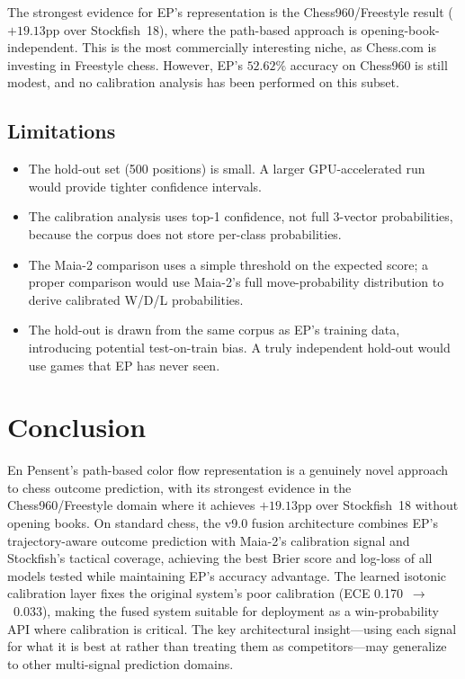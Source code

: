 \documentclass[11pt,a4paper]{article}
\begin{document}
The strongest evidence for EP's representation is the Chess960/Freestyle
result ($+19.13$pp over Stockfish~18), where the path-based approach is
opening-book-independent. This is the most commercially interesting niche,
as Chess.com is investing in Freestyle chess. However, EP's $52.62\%$
accuracy on Chess960 is still modest, and no calibration analysis has been
performed on this subset.

\subsection{Limitations}

\begin{itemize}[nosep]
  \item The hold-out set (500 positions) is small. A larger GPU-accelerated
        run would provide tighter confidence intervals.
  \item The calibration analysis uses top-1 confidence, not full 3-vector
        probabilities, because the corpus does not store per-class
        probabilities.
  \item The Maia-2 comparison uses a simple threshold on the expected
        score; a proper comparison would use Maia-2's full move-probability
        distribution to derive calibrated W/D/L probabilities.
  \item The hold-out is drawn from the same corpus as EP's training data,
        introducing potential test-on-train bias. A truly independent
        hold-out would use games that EP has never seen.
\end{itemize}

\section{Conclusion}
\label{sec:conclusion}

En Pensent's path-based color flow representation is a genuinely novel
approach to chess outcome prediction, with its strongest evidence in the
Chess960/Freestyle domain where it achieves $+19.13$pp over Stockfish~18
without opening books. On standard chess, the v9.0 fusion architecture
combines EP's trajectory-aware outcome prediction with Maia-2's calibration
signal and Stockfish's tactical coverage, achieving the best Brier score
and log-loss of all models tested while maintaining EP's accuracy
advantage. The learned isotonic calibration layer fixes the original
system's poor calibration (ECE 0.170~$\to$~0.033), making the fused system
suitable for deployment as a win-probability API where calibration is
critical. The key architectural insight---using each signal for what it is
best at rather than treating them as competitors---may generalize to other
multi-signal prediction domains.
\end{document}
